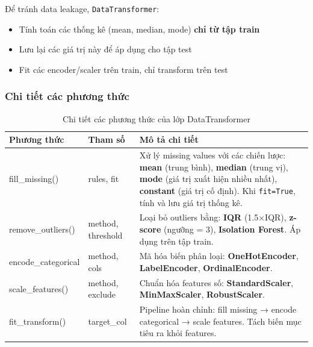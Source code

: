 \documentclass[12pt,a4paper]{article}
\begin{document}
Để tránh data leakage, \texttt{DataTransformer}:
\begin{itemize}
    \item Tính toán các thống kê (mean, median, mode) \textbf{chỉ từ tập train}
    \item Lưu lại các giá trị này để áp dụng cho tập test
    \item Fit các encoder/scaler trên train, chỉ transform trên test
\end{itemize}

\subsubsection{Chi tiết các phương thức}

\begin{table}[H]
\centering
\caption{Chi tiết các phương thức của lớp DataTransformer}
\label{tab:datatransformer_methods}

\renewcommand{\arraystretch}{1.25} %

\begin{tabular}{|>{\raggedright\arraybackslash\ttfamily}p{3.8cm}|
                >{\raggedright\arraybackslash}p{3cm}|
                >{\raggedright\arraybackslash}p{8cm}|}
\hline
\textbf{Phương thức} & \textbf{Tham số} & \textbf{Mô tả chi tiết} \\
\hline

fill\_missing() & rules, fit &
Xử lý missing values với các chiến lược:
\textbf{mean} (trung bình),
\textbf{median} (trung vị),
\textbf{mode} (giá trị xuất hiện nhiều nhất),
\textbf{constant} (giá trị cố định).
Khi \texttt{fit=True}, tính và lưu giá trị thống kê. \\
\hline

remove\_outliers() & method, threshold &
Loại bỏ outliers bằng:
\textbf{IQR} (1.5×IQR),
\textbf{z-score} (ngưỡng = 3),
\textbf{Isolation Forest}.
Áp dụng trên tập train. \\
\hline

encode\_categorical & method, cols &
Mã hóa biến phân loại:
\textbf{OneHotEncoder},
\textbf{LabelEncoder},
\textbf{OrdinalEncoder}. \\
\hline

scale\_features() & method, exclude &
Chuẩn hóa features số:
\textbf{StandardScaler},
\textbf{MinMaxScaler},
\textbf{RobustScaler}. \\
\hline

fit\_transform() & target\_col &
Pipeline hoàn chỉnh:
fill missing → encode categorical → scale features.
Tách biến mục tiêu ra khỏi features. \\
\hline


\end{tabular}
\end{table}
\end{document}
